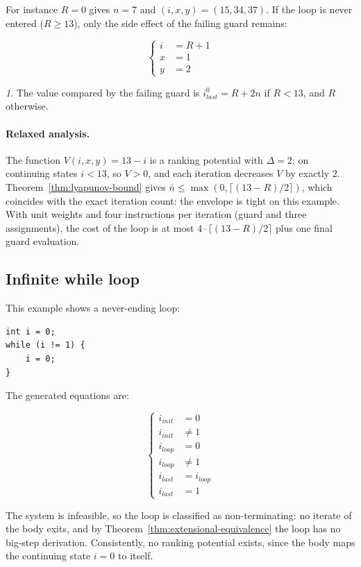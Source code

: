 \documentclass[oneside,english]{amsart}
\numberwithin{equation}{section}
\numberwithin{figure}{section}
\theoremstyle{plain}
\theoremstyle{definition}
\theoremstyle{plain}
\theoremstyle{remark}
\newtheorem*{rem*}{\protect\remarkname}
\theoremstyle{plain}
\theoremstyle{definition}
\theoremstyle{plain}
\theoremstyle{remark}
\providecommand{\remarkname}{Remark}
\begin{document}
For instance $R = 0$ gives $n = 7$ and $(i, x, y) = (15, 34, 37)$. If the loop is never entered ($R\geq13$), only the side effect of the failing guard remains:

\[
\begin{cases}
i & =R+1\\
x & =1\\
y & =2
\end{cases}
\]

\begin{rem*}
The value compared by the failing guard is $i_{last}^{0}=R+2n$ if $R<13$, and $R$ otherwise.
\end{rem*}

\paragraph{Relaxed analysis.}
The function $V(i, x, y) = 13 - i$ is a ranking potential with $\Delta = 2$: on continuing states $i < 13$, so $V > 0$, and each iteration decreases $V$ by exactly $2$. Theorem~\ref{thm:lyapunov-bound} gives $\bar{n} \le \max(0, \lceil (13 - R)/2 \rceil)$, which coincides with the exact iteration count: the envelope is tight on this example. With unit weights and four instructions per iteration (guard and three assignments), the cost of the loop is at most $4 \cdot \lceil (13 - R)/2 \rceil$ plus one final guard evaluation.

\subsection{Infinite while loop}

This example shows a never-ending loop:

\begin{lstlisting}
int i = 0;
while (i != 1) {
    i = 0;
}
\end{lstlisting}

The generated equations are:

\[
\begin{cases}
i_{init} & =0\\
i_{init} & \neq1\\
i_{loop} & =0\\
i_{loop} & \neq1\\
i_{last} & =i_{loop}\\
i_{last} & =1
\end{cases}
\]

The system is infeasible, so the loop is classified as non-terminating: no iterate of the body exits, and by Theorem~\ref{thm:extensional-equivalence} the loop has no big-step derivation. Consistently, no ranking potential exists, since the body maps the continuing state $i = 0$ to itself.
\end{document}
